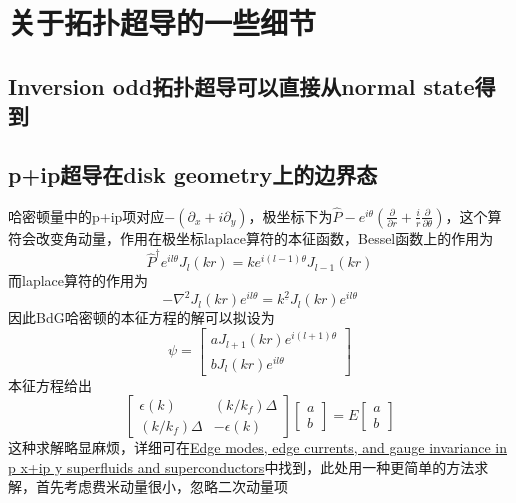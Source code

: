 \documentclass[10pt,openany]{book}
\theoremstyle{thmstyle} %
\theoremstyle{defstyle} %
\theoremstyle{prostyle} %
\begin{document}
\section{关于拓扑超导的一些细节}
\subsection{Inversion odd拓扑超导可以直接从normal state得到}
\subsection{p+ip超导在disk geometry上的边界态}
哈密顿量中的p+ip项对应$ -\left(\partial_x+i \partial_y\right) $，极坐标下为$ \hat{P}-e^{i \theta}\left(\frac{\partial}{\partial r}+\frac{i}{r} \frac{\partial}{\partial \theta}\right) $，这个算符会改变角动量，作用在极坐标laplace算符的本征函数，Bessel函数上的作用为
\begin{equation*}
  \hat{P}^{\dagger} e^{i l \theta} J_l(k r)=k e^{i(l-1) \theta} J_{l-1}(k r)
\end{equation*}
而laplace算符的作用为
\begin{equation*}
  -\nabla^2 J_l(k r) e^{i l \theta}=k^{\underline{2}} J_l(k r) e^{i l \theta}
\end{equation*}
因此BdG哈密顿的本征方程的解可以拟设为
\begin{equation*}
  \psi=\left[\begin{array}{l}
    a J_{l+1}(k r) e^{i(l+1) \theta} \\
    b J_l(k r) e^{i l \theta}
    \end{array}\right]
\end{equation*}
本征方程给出
\begin{equation*}
  \left[\begin{array}{ll}
    \epsilon(k) & \left(k / k_f\right) \Delta \\
    \left(k / k_f\right) \Delta & -\epsilon(k)
    \end{array}\right]\left[\begin{array}{l}
    a \\
    b
    \end{array}\right]=E\left[\begin{array}{l}
    a \\
    b
    \end{array}\right]
\end{equation*}
这种求解略显麻烦，详细可在\href{https://journals.aps.org/prb/pdf/10.1103/PhysRevB.69.184511}{Edge modes, edge currents, and gauge invariance in p x+ip y superfluids and superconductors}中找到，此处用一种更简单的方法求解，首先考虑费米动量很小，忽略二次动量项
\end{document}
